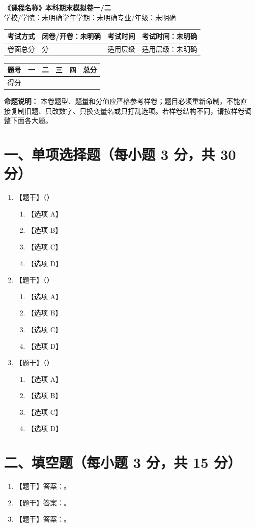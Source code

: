 \documentclass[UTF8,12pt,a4paper]{ctexart}
\newcommand{\CourseName}{课程名称}
\newcommand{\ExamSetName}{一/二}
\newcommand{\SchoolInfo}{学校/学院：未明确}
\newcommand{\TermInfo}{学年学期：未明确}
\newcommand{\MajorInfo}{专业/年级：未明确}
\newcommand{\ExamType}{闭卷/开卷：未明确}
\newcommand{\ExamDuration}{考试时间：未明确}
\newcommand{\ExamScore}{100 分}
\newcommand{\ExamLevel}{适用层级：未明确}
\newenvironment{choices}{\begin{enumerate}[label=(\Alph*),leftmargin=3.5em,itemsep=0.1em]}{\end{enumerate}}
\newcommand{\examtitle}{%
\begin{center}
  {\LARGE\bfseries 《\CourseName》本科期末模拟卷\ExamSetName}\\[0.4em]
  {\small \SchoolInfo\quad \TermInfo\quad \MajorInfo}\\[0.8em]
\end{center}}
\newcommand{\examinfo}{%
\begin{center}
\begin{tabular}{|>{\centering\arraybackslash}p{2.5cm}|>{\centering\arraybackslash}p{3.5cm}|>{\centering\arraybackslash}p{2.5cm}|>{\centering\arraybackslash}p{3.5cm}|}
\hline
考试方式 & \ExamType & 考试时间 & \ExamDuration \\ \hline
卷面总分 & \ExamScore & 适用层级 & \ExamLevel \\ \hline
\end{tabular}
\end{center}}
\newcommand{\scoretable}{%
\begin{center}
\begin{tabular}{|c|c|c|c|c|c|}
\hline
题号 & 一 & 二 & 三 & 四 & 总分 \\ \hline
得分 & & & & & \\ \hline
\end{tabular}
\end{center}}
\begin{document}
\examtitle
\examinfo
\scoretable

\noindent\textbf{命题说明：}
本卷题型、题量和分值应严格参考样卷；题目必须重新命制，不能直接复制旧题、只改数字、只换变量名或只打乱选项。若样卷结构不同，请按样卷调整下面各大题。

\section*{一、单项选择题（每小题 3 分，共 30 分）}

\begin{enumerate}
\item 【题干】（\quad）
\begin{choices}
\item 【选项 A】
\item 【选项 B】
\item 【选项 C】
\item 【选项 D】
\end{choices}

\item 【题干】（\quad）
\begin{choices}
\item 【选项 A】
\item 【选项 B】
\item 【选项 C】
\item 【选项 D】
\end{choices}

\item 【题干】（\quad）
\begin{choices}
\item 【选项 A】
\item 【选项 B】
\item 【选项 C】
\item 【选项 D】
\end{choices}

\end{enumerate}

\section*{二、填空题（每小题 3 分，共 15 分）}

\begin{enumerate}
\item 【题干】答案：\underline{\hspace{3cm}}。
\item 【题干】答案：\underline{\hspace{3cm}}。
\item 【题干】答案：\underline{\hspace{3cm}}。
\end{enumerate}
\end{document}
